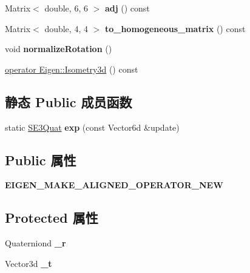 \begin{DoxyCompactItemize}
\item 
\hypertarget{classg2o_1_1SE3Quat_aa789e613e540b2f28b02b663c67c4f83}{Matrix$<$ double, 6, 6 $>$ {\bfseries adj} () const }\label{classg2o_1_1SE3Quat_aa789e613e540b2f28b02b663c67c4f83}

\item 
\hypertarget{classg2o_1_1SE3Quat_a942d8c3fc4de26560eaf187315700c5b}{Matrix$<$ double, 4, 4 $>$ {\bfseries to\-\_\-homogeneous\-\_\-matrix} () const }\label{classg2o_1_1SE3Quat_a942d8c3fc4de26560eaf187315700c5b}

\item 
\hypertarget{classg2o_1_1SE3Quat_a0e2c54c6dfdaa71b677556a9d8e4e88a}{void {\bfseries normalize\-Rotation} ()}\label{classg2o_1_1SE3Quat_a0e2c54c6dfdaa71b677556a9d8e4e88a}

\item 
\hyperlink{classg2o_1_1SE3Quat_ab71ee71bcff36763d611d63df72b04ca}{operator Eigen\-::\-Isometry3d} () const 
\end{DoxyCompactItemize}
\subsection*{静态 Public 成员函数}
\begin{DoxyCompactItemize}
\item 
\hypertarget{classg2o_1_1SE3Quat_a374a05b202889d09d5a3a25e0fb6c103}{static \hyperlink{classg2o_1_1SE3Quat}{S\-E3\-Quat} {\bfseries exp} (const Vector6d \&update)}\label{classg2o_1_1SE3Quat_a374a05b202889d09d5a3a25e0fb6c103}

\end{DoxyCompactItemize}
\subsection*{Public 属性}
\begin{DoxyCompactItemize}
\item 
\hypertarget{classg2o_1_1SE3Quat_a5bcd64993957b1a87a113d9a282d4fcb}{{\bfseries E\-I\-G\-E\-N\-\_\-\-M\-A\-K\-E\-\_\-\-A\-L\-I\-G\-N\-E\-D\-\_\-\-O\-P\-E\-R\-A\-T\-O\-R\-\_\-\-N\-E\-W}}\label{classg2o_1_1SE3Quat_a5bcd64993957b1a87a113d9a282d4fcb}

\end{DoxyCompactItemize}
\subsection*{Protected 属性}
\begin{DoxyCompactItemize}
\item 
\hypertarget{classg2o_1_1SE3Quat_a420255bcfca499dc2669b27fd373f665}{Quaterniond {\bfseries \-\_\-r}}\label{classg2o_1_1SE3Quat_a420255bcfca499dc2669b27fd373f665}

\item 
\hypertarget{classg2o_1_1SE3Quat_a7f0078e2750e8f821926f2d51202a809}{Vector3d {\bfseries \-\_\-t}}\label{classg2o_1_1SE3Quat_a7f0078e2750e8f821926f2d51202a809}

\end{DoxyCompactItemize}



